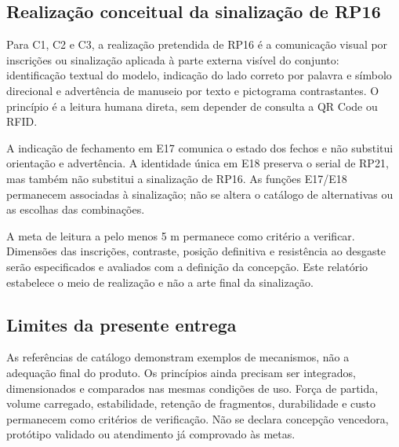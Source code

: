 \subsection{Realização conceitual da sinalização de RP16}
Para C1, C2 e C3, a realização pretendida de RP16 é a comunicação visual por inscrições ou sinalização aplicada à parte externa visível do conjunto: identificação textual do modelo, indicação do lado correto por palavra e símbolo direcional e advertência de manuseio por texto e pictograma contrastantes. O princípio é a leitura humana direta, sem depender de consulta a QR Code ou RFID.

A indicação de fechamento em E17 comunica o estado dos fechos e não substitui orientação e advertência. A identidade única em E18 preserva o serial de RP21, mas também não substitui a sinalização de RP16. As funções E17/E18 permanecem associadas à sinalização; não se altera o catálogo de alternativas ou as escolhas das combinações.

A meta de leitura a pelo menos 5 m permanece como critério a verificar. Dimensões das inscrições, contraste, posição definitiva e resistência ao desgaste serão especificados e avaliados com a definição da concepção. Este relatório estabelece o meio de realização e não a arte final da sinalização.

\subsection{Limites da presente entrega}
As referências de catálogo demonstram exemplos de mecanismos, não a adequação final do produto. Os princípios ainda precisam ser integrados, dimensionados e comparados nas mesmas condições de uso. Força de partida, volume carregado, estabilidade, retenção de fragmentos, durabilidade e custo permanecem como critérios de verificação. Não se declara concepção vencedora, protótipo validado ou atendimento já comprovado às metas.
